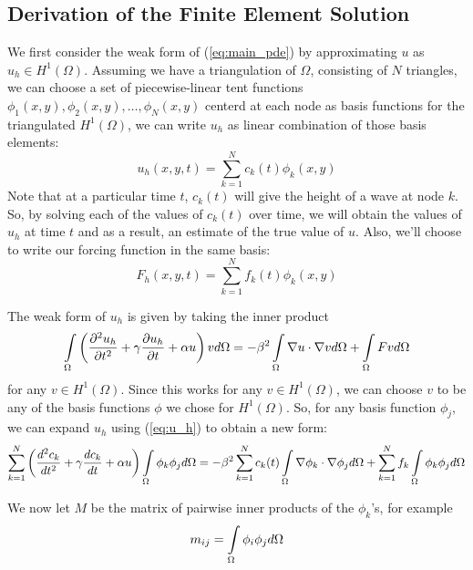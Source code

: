 \subsection{Derivation of the Finite Element Solution}
We first consider the weak form of (\ref{eq:main_pde}) by approximating $u$ as $u_h \in H^1(\Omega)$. Assuming we have
a triangulation of $\Omega$, consisting of $N$ triangles, we can choose 
a set of piecewise-linear tent functions $\phi_1(x,y), \phi_2(x,y), \ldots, \phi_N(x,y)$ centerd at each node as basis
functions for the triangulated $H^1(\Omega)$, we can write $u_h$ as linear
combination of those basis elements:
\begin{equation} \label{eq:u_h}
u_h(x,y,t) = \sum\limits_{k=1}^N c_k(t) \phi_k(x,y)
\end{equation}
Note that at a particular time $t$, $c_k(t)$ will give the height of a wave at node $k$. So, by solving each of the values
of $c_k(t)$ over time, we will obtain the values of $u_h$ at time $t$ and as a result, an estimate of the true value of $u$.
Also, we'll choose to write our forcing function in the same basis:
\begin{equation}
F_h(x,y,t) = \sum\limits_{k=1}^N f_k(t) \phi_k(x,y)
\end{equation}

The weak form of $u_h$ is given by taking the inner product 
\begin{equation} \label{eq:u_h_weak_form}
\int\limits_{\Omega}  \left( \frac{\partial^2 u_h}{\partial t^2} + \gamma \frac{\partial u_h}{\partial t} + \alpha u \right)   v  d\Omega
=
- \beta^2 \int\limits_{\Omega} \nabla u \cdot \nabla v d\Omega
+ \int\limits_{\Omega} F v d\Omega
\end{equation}
for any $v \in H^1(\Omega)$. Since this works for any $v \in H^1(\Omega)$, we can choose $v$ to be any of the basis functions $\phi$
we chose for $H^1(\Omega)$. So, for any basis function $\phi_j$, we can expand $u_h$ using (\ref{eq:u_h}) to obtain a new form:
\begin{equation} \label{eq:u_h_weak_form_expanded}
\sum\limits_{k=1}^N \left( \frac{d^2 c_k}{d t^2} + \gamma\frac{d c_k}{d t} + \alpha u \right) \int\limits_{\Omega} \phi_k \phi_j d\Omega
=
- \beta^2\sum\limits_{k=1}^N c_k(t) \int\limits_{\Omega} \nabla \phi_k \cdot \nabla \phi_j d\Omega
+
\sum\limits_{k=1}^N f_k \int\limits_{\Omega} \phi_k \phi_j d\Omega
\end{equation}

We now let $M$ be the matrix of pairwise inner products of the $\phi_k$'s, for example
\begin{equation} \label{eq:m_definition}
m_{ij} = \int\limits_{\Omega} \phi_i \phi_j d\Omega
\end{equation}

